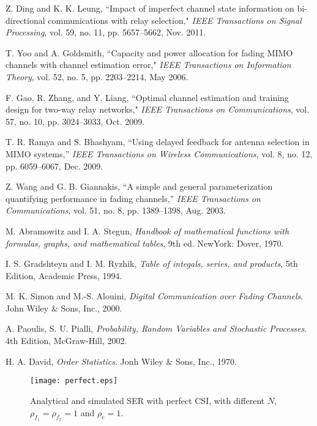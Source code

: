 \documentclass[onecolumn,letterpaper,11pt,draftclsnofoot]{IEEEtran}
\begin{document}
\begin{thebibliography}{1}
Z. Ding and K. K. Leung, ``Impact of imperfect channel state
information on bi-directional communications with relay selection,"
\emph{IEEE Transactions on Signal Processing}, vol. 59, no. 11, pp.
5657--5662, Nov. 2011.

T. Yoo and A. Goldsmith, ``Capacity and power allocation for
fading MIMO channels with channel estimation error," \emph{IEEE
Transactions on Information Theory}, vol. 52, no. 5, pp. 2203--2214,
May 2006.

F. Gao, R. Zhang, and Y. Liang, ``Optimal channel
estimation and training design for two-way relay networks,"
\emph{IEEE Transactions on Communications}, vol. 57, no. 10, pp.
3024--3033, Oct. 2009.

T. R. Ramya and S. Bhashyam, ``Using delayed feedback for antenna
selection in MIMO systems,'' \emph{IEEE Transactions on Wireless
Communications}, vol. 8, no. 12, pp. 6059--6067, Dec. 2009.

Z. Wang and G. B. Giannakis, ``A simple and general parameterization quantifying performance in fading
channels,'' \emph{IEEE Transactions on Communications}, vol. 51, no.
8, pp. 1389--1398, Aug. 2003.


 M. Abramowitz and I. A. Stegun, \emph{Handbook of mathematical functions with formulas, graphs, and mathematical tables}, 9th ed.
    NewYork: Dover, 1970.

 I. S. Gradshteyn and I. M. Ryzhik, \emph{Table of integals, series, and products}, 5th Edition, Academic Press, 1994.

M. K. Simon and M.-S. Alouini, \emph{Digital Communication over Fading
Channels}. John Wiley $\&$ Sons, Inc., 2000.

 A. Paoulis, S. U. Pialli, \emph{Probability, Random Variables and Stochastic
Processes}. 4th Edition, McGraw-Hill, 2002.

 H. A. David, \emph{Order Statistics}. Jonh Wiley $\&$ Sons, Inc., 1970.

\end{thebibliography}


\newpage

\begin{figure}[h!]
\centering
\texttt{[image: perfect.eps]}
\caption{Analytical and simulated SER with perfect CSI, with
different $N$, $\rho_{f_1}=\rho_{f_2}=1$ and $\rho_e=1$.}
\label{fig:4}
\end{figure}
\end{document}
